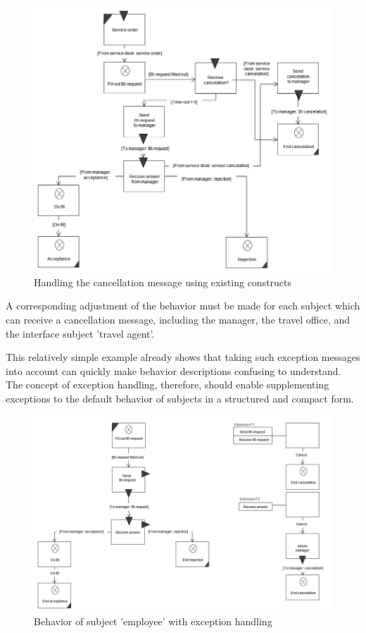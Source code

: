 \begin{figure}[htbp]
	\centering
	\includegraphics[width=0.7\linewidth]{Figures/Ontology/SubjectExecution/ExceptionHandling}
	\caption[Handling the cancellation message using existing constructs]{Handling the cancellation message using existing constructs}
	\label{fig:exceptionhandling}
\end{figure}

A corresponding adjustment of the behavior must be made for each subject which can receive a cancellation message, including the manager, the travel office, and the interface subject 'travel agent'.

This relatively simple example already shows that taking such exception messages into account can quickly make behavior descriptions confusing to understand. The concept of exception handling, therefore, should enable supplementing exceptions to the default behavior of subjects in a structured and compact form. 

\begin{figure}[htbp]
	\centering
	\includegraphics[width=0.7\linewidth]{Figures/Ontology/SubjectExecution/Extension}
	\caption[Behavior of subject 'employee' with exception handling]{Behavior of subject 'employee' with exception handling}
	\label{fig:extension}
\end{figure}

